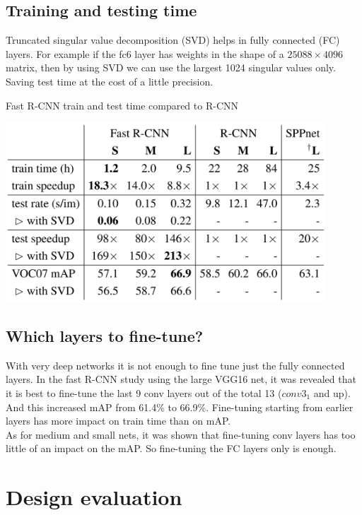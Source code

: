 \documentclass[10pt]{article}
\begin{document}
\subsection{Training and testing time}

Truncated singular value decomposition (SVD) helps in fully connected (FC) layers. For example if the fc6 layer has weights in the shape of a $25088\times4096$ matrix, then by using SVD we can use the largest 1024 singular values only. Saving test time at the cost of a little precision.

\begin{center}
\begin{table}
\caption{Fast R-CNN train and test time compared to R-CNN}
\includegraphics[width=0.9\textwidth]{20220602 1 speed.PNG}
\end{table}
\end{center}

\subsection{Which layers to fine-tune?}
With very deep networks it is not enough to fine tune just the fully connected layers. In the fast R-CNN study using the large VGG16 net, it was revealed that it is best to fine-tune the last 9 conv layers out of the total 13 ($conv3_1$ and up). And this increased mAP from 61.4\% to 66.9\%. Fine-tuning starting from earlier layers has more impact on train time than on mAP.\\
As for medium and small nets, it was shown that fine-tuning conv layers has too little of an impact on the mAP. So fine-tuning the FC layers only is enough.


\section{Design evaluation}
\end{document}
